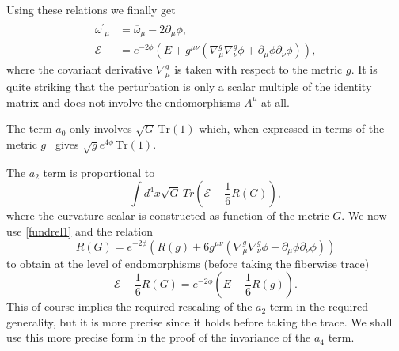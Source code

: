 \documentclass[12pt]{article}%
\begin{document}
Using these relations we finally get
\begin{align}
\label{fundrel}\overline{\omega^{\prime}}_{\mu}  &  =\overline{\omega}_{\mu
}-2\partial_{\mu}\phi,\\
\mathcal{E}  &  =e^{-2\phi}\left(  E+g^{\mu\nu}\left(  \nabla_{\mu}^{g}%
\nabla_{\nu}^{g}\phi+\partial_{\mu}\phi\partial_{\nu}\phi\right)  \right)  ,
\label{fundrel1}%
\end{align}
where the covariant derivative $\nabla_{\mu}^{g}$ is taken with respect to the
metric $g.$ It is quite striking that the perturbation is only a scalar
multiple of the identity matrix and does not involve the endomorphisms
$A^{\mu}$ at all.

The term $a_{0}$ only involves $\sqrt{G} \,\mathrm{Tr}(1)$ which, when
expressed in terms of the metric $g$ \ gives $\sqrt{g}e^{4\phi}\,\mathrm{Tr}%
(1)$.

The $a_{2}$ term is proportional to
\[
\int d^{4}x\sqrt{G}\,Tr\left(  \mathcal{E}-\frac{1}{6}R\left(  G\right)
\right)  ,
\]
where the curvature scalar is constructed as function of the metric $G.$ We
now use \eqref{fundrel1} and the relation
\begin{equation}
\label{scalar}R\left(  G\right)  =e^{-2\phi}\left(  R\left(  g\right)
+6g^{\mu\nu}\left(  \nabla_{\mu}^{g}\nabla_{\nu}^{g}\phi+\partial_{\mu}%
\phi\partial_{\nu}\phi\right)  \right)
\end{equation}
to obtain at the level of endomorphisms (before taking the fiberwise trace)
\begin{equation}
\label{invscale}\mathcal{E}-\frac{1}{6}R\left(  G\right)  =e^{-2\phi}\left(
E-\frac{1}{6}R\left(  g\right)  \right)  .
\end{equation}
This of course implies the required rescaling of the $a_{2}$ term in the
required generality, but it is more precise since it holds before taking the
trace. We shall use this more precise form in the proof of the invariance of
the $a_{4}$ term.
\end{document}
